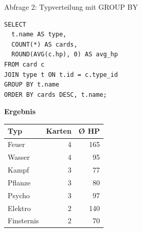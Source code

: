 \documentclass[aspectratio=169,11pt]{beamer}
\begin{document}
\begin{frame}[fragile]{Abfrage 2: Typverteilung mit GROUP BY}
  \begin{minipage}[t]{0.50\textwidth}
    \begin{panel}
\begin{lstlisting}
SELECT
  t.name AS type,
  COUNT(*) AS cards,
  ROUND(AVG(c.hp), 0) AS avg_hp
FROM card c
JOIN type t ON t.id = c.type_id
GROUP BY t.name
ORDER BY cards DESC, t.name;
\end{lstlisting}
    \end{panel}
  \end{minipage}\hfill
  \begin{minipage}[t]{0.46\textwidth}
    \begin{panel}[colback=softgold,colframe=gold!45]
      {\bfseries Ergebnis}\par
      \vspace{0.2em}
      \begin{tabularx}{\linewidth}{@{}Yrr@{}}
        \toprule
        Typ & Karten & Ø HP \\
        \midrule
        Feuer & 4 & 165 \\
        Wasser & 4 & 95 \\
        Kampf & 3 & 77 \\
        Pflanze & 3 & 80 \\
        Psycho & 3 & 97 \\
        Elektro & 2 & 140 \\
        Finsternis & 2 & 70 \\
        \bottomrule
      \end{tabularx}
    \end{panel}
  \end{minipage}
\end{frame}
\end{document}
